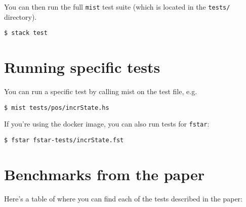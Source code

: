 \documentclass[
]{darts-v2021}
\begin{document}
You can then run the full \texttt{mist} test suite (which is located in
the \texttt{tests/} directory).

\begin{verbatim}
$ stack test
\end{verbatim}

\hypertarget{running-specific-tests}{%
\section{Running specific tests}\label{running-specific-tests}}

You can run a specific test by calling mist on the test file, e.g.

\begin{verbatim}
$ mist tests/pos/incrState.hs
\end{verbatim}

If you're using the docker image, you can also run tests for
\texttt{fstar}:

\begin{verbatim}
$ fstar fstar-tests/incrState.fst
\end{verbatim}

\hypertarget{benchmarks-from-the-paper}{%
\section{Benchmarks from the paper}\label{benchmarks-from-the-paper}}

Here's a table of where you can find each of the tests described in the
paper:
\end{document}
